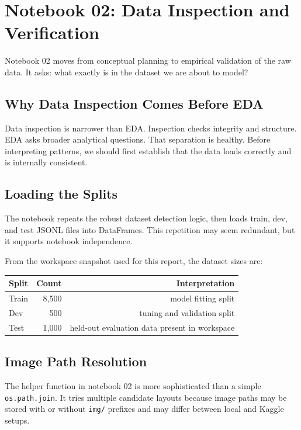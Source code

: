 \documentclass[11pt,a4paper]{report}
\begin{document}
\chapter{Notebook 02: Data Inspection and Verification}

Notebook 02 moves from conceptual planning to empirical validation of the raw data. It asks: what exactly is in the dataset we are about to model?

\section{Why Data Inspection Comes Before EDA}

Data inspection is narrower than EDA. Inspection checks integrity and structure. EDA asks broader analytical questions. That separation is healthy. Before interpreting patterns, we should first establish that the data loads correctly and is internally consistent.

\section{Loading the Splits}

The notebook repeats the robust dataset detection logic, then loads train, dev, and test JSONL files into DataFrames. This repetition may seem redundant, but it supports notebook independence.

From the workspace snapshot used for this report, the dataset sizes are:

\begin{center}
\begin{tabular}{lrr}
\toprule
Split & Count & Interpretation \\
\midrule
Train & 8,500 & model fitting split \\
Dev & 500 & tuning and validation split \\
Test & 1,000 & held-out evaluation data present in workspace \\
\bottomrule
\end{tabular}
\end{center}

\section{Image Path Resolution}

The helper function in notebook 02 is more sophisticated than a simple \texttt{os.path.join}. It tries multiple candidate layouts because image paths may be stored with or without \texttt{img/} prefixes and may differ between local and Kaggle setups.
\end{document}

